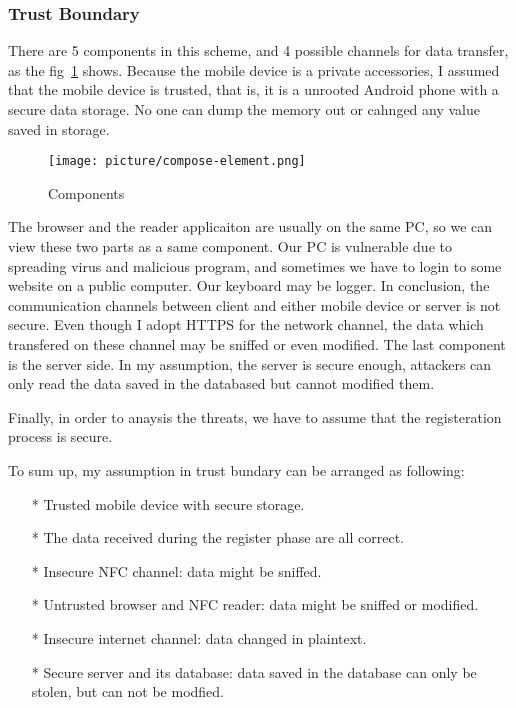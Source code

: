 \begin{CJK}{Bg5}{bsmi}
\subsubsection{Trust Boundary}

There are 5 components in this scheme, and 4 possible channels for data transfer, as the fig~\ref{fig:compose-element} shows. Because the mobile device is a private accessories, I assumed that the mobile device is trusted, that is, it is a unrooted Android phone with a secure data storage. No one can dump the memory out or cahnged any value saved in storage. 

\begin{figure}
\centering
\texttt{[image: picture/compose-element.png]}
\caption{Components}
\label{fig:compose-element}
\end{figure}

The browser and the reader applicaiton are usually on the same PC, so we can view these two parts as a same component. Our PC is vulnerable due to spreading virus and malicious program, and sometimes we have to login to some website on a public computer. Our keyboard may be logger. In conclusion, the communication channels between client and either mobile device or server is not secure. Even though I adopt HTTPS for the network channel, the data which transfered on these channel may be sniffed or even modified. The last component is the server side. In my assumption, the server is secure enough, attackers can only read the data saved in the databased but cannot modified them.

Finally, in order to anaysis the threats, we have to assume that the registeration process is secure.

To sum up, my assumption in trust bundary can be arranged as following:
\begin{enumerate}
\item[*] Trusted mobile device with secure storage.
\item[*] The data received during the register phase are all correct.
\item[*] Insecure NFC channel: data might be sniffed.
\item[*] Untrusted browser and NFC reader: data might be sniffed or modified.
\item[*] Insecure internet channel: data changed in plaintext.
\item[*] Secure server and its database: data saved in the database can only be stolen, but can not be modfied.
\end{enumerate}


\end{CJK}
